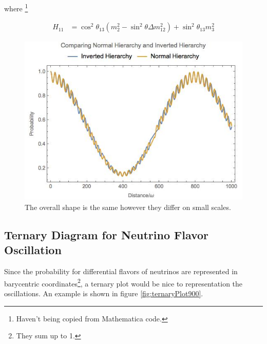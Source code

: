 \documentclass{tufte-handout}
\begin{document}
where \footnote{Haven't being copied from Mathematica code.}

\begin{align*}
H_{11} & = \cos^2\theta_{13}( m_2^2 - \sin^2\theta  \Delta m_{12}^2 ) + \sin^2\theta_{13} m_3^2 
\end{align*}




\begin{figure}
\includegraphics{assets/vacOsc3Flavor}
\caption{The overall shape is the same however they differ on small scales.}
\end{figure}





\subsection{Ternary Diagram for Neutrino Flavor Oscillation}

Since the probability for differential flavors of neutrinos are represented in barycentric coordinates\footnote{They sum up to 1.}, a ternary plot would be nice to representation the oscillations. An example is shown in figure \ref{fig:ternaryPlot900}.
\end{document}
